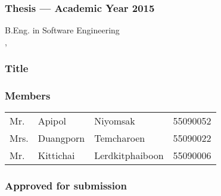 \thispagestyle{empty}

\begin{flushleft}
\subsubsection{\Large{Thesis --- Academic Year 2015}}
B.Eng. in Software Engineering \\
\IC, \kmitl

\vspace{2cm}

\subsubsection{\Large{Title}}
\dms

\vspace{1cm}
\subsubsection{\Large{Members}}
\begin{tabular}{llll}
	Mr. & Apipol & Niyomsak & 55090052 \\
	Mrs. & Duangporn & Temcharoen & 55090022 \\
	Mr. & Kittichai & Lerdkitphaiboon & 55090006 \\
\end{tabular}
\end{flushleft}

\vfill

\begin{flushright}
\subsubsection{\Large{Approved for submission}}
\vspace{1cm}
\vspace{1cm}
 \\
\end{flushright}